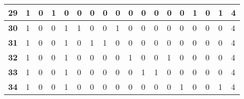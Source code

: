 \begin{center}
\begin{longtable}{|P{0.3cm}|P{0.3cm}|P{0.3cm}|P{0.3cm}|P{0.3cm}|P{0.3cm}|P{0.3cm}|P{0.3cm}|P{0.3cm}|P{0.3cm}|P{0.3cm}|P{0.3cm}|P{0.3cm}|P{0.3cm}|P{0.3cm}|P{0.3cm}|P{0.3cm}|P{1.4cm}|}
\textbf{29}                        & 1                     & 0                     & 1                     & 0                     & 0                     & 0                     & 0                     & 0                     & 0                     & 0                     & 0                     & 0                     & 0                     & 1                     & 0                     & 1                     & 4                     \\ \hline
\textbf{30}                        & 1                     & 0                     & 0                     & 1                     & 1                     & 0                     & 0                     & 1                     & 0                     & 0                     & 0                     & 0                     & 0                     & 0                     & 0                     & 0                     & 4                     \\ \hline
\textbf{31}                        & 1                     & 0                     & 0                     & 1                     & 0                     & 1                     & 1                     & 0                     & 0                     & 0                     & 0                     & 0                     & 0                     & 0                     & 0                     & 0                     & 4                     \\ \hline
\textbf{32}                        & 1                     & 0                     & 0                     & 1                     & 0                     & 0                     & 0                     & 0                     & 1                     & 0                     & 0                     & 1                     & 0                     & 0                     & 0                     & 0                     & 4                     \\ \hline
\textbf{33}                        & 1                     & 0                     & 0                     & 1                     & 0                     & 0                     & 0                     & 0                     & 0                     & 1                     & 1                     & 0                     & 0                     & 0                     & 0                     & 0                     & 4                     \\ \hline
\textbf{34}                        & 1                     & 0                     & 0                     & 1                     & 0                     & 0                     & 0                     & 0                     & 0                     & 0                     & 0                     & 0                     & 1                     & 0                     & 0                     & 1                     & 4                     \\ \hline

\end{longtable}
\end{center}
